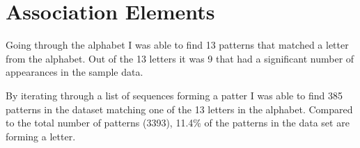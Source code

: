 \section{Association Elements} \label{sec:associationelements}
	Going through the alphabet I was able to find 13 patterns that matched a letter from the alphabet. Out of the 13 letters it was 9 that had a significant number of appearances in the sample data. 

  By iterating through a list of sequences forming a patter I was able to find 385 patterns in the dataset matching one of the 13 letters in the alphabet. Compared to the total number of patterns (3393), 11.4\% of the patterns in the data set are forming a letter.

  \clearpage

    \begin{figure}[H]
      \centering
      \vspace{1.5cm}



\end{figure}
